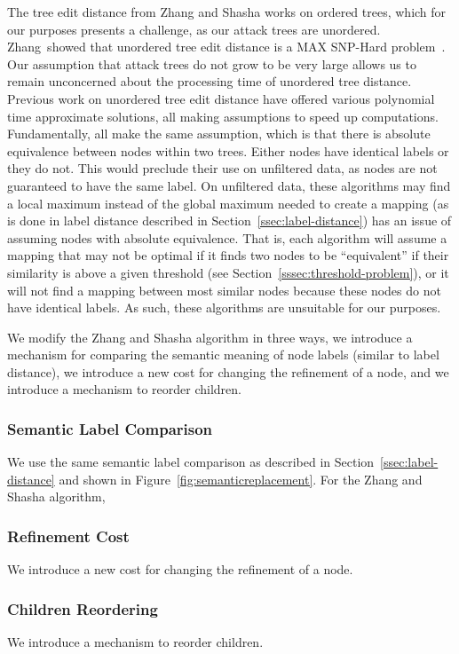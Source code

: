 The tree edit distance from Zhang and Shasha works on ordered trees, which for our purposes presents a challenge, as our attack trees are unordered. Zhang~\etal showed that unordered tree edit distance is a MAX SNP-Hard problem~\cite{zhang_max_1994}. Our assumption that attack trees do not grow to be very large allows us to remain unconcerned about the processing time of unordered tree distance. Previous work on unordered tree edit distance have offered various polynomial time approximate solutions, all making assumptions to speed up computations. Fundamentally, all make the same assumption, which is that there is absolute equivalence between nodes within two trees. Either nodes have identical labels or they do not. This would preclude their use on unfiltered data, as nodes are not guaranteed to have the same label. On unfiltered data, these algorithms may find a local maximum instead of the global maximum needed to create a mapping (as is done in label distance described in Section~\ref{ssec:label-distance}) has an issue of assuming nodes with absolute equivalence. That is, each algorithm will assume a mapping that may not be optimal if it finds two nodes to be ``equivalent'' if their similarity is above a given threshold (see Section~\ref{sssec:threshold-problem}), or it will not find a mapping between most similar nodes because these nodes do not have identical labels. As such, these algorithms are unsuitable for our purposes.


We modify the Zhang and Shasha algorithm in three ways, we introduce a mechanism for comparing the semantic meaning of node labels (similar to label distance), we introduce a new cost for changing the refinement of a node, and we introduce a mechanism to reorder children.

\subsubsection{Semantic Label Comparison}
We use the same semantic label comparison as described in Section~\ref{ssec:label-distance} and shown in Figure~\ref{fig:semanticreplacement}. For the Zhang and Shasha algorithm, 

\subsubsection{Refinement Cost}
We introduce a new cost for changing the refinement of a node.

\subsubsection{Children Reordering}
We introduce a mechanism to reorder children.





